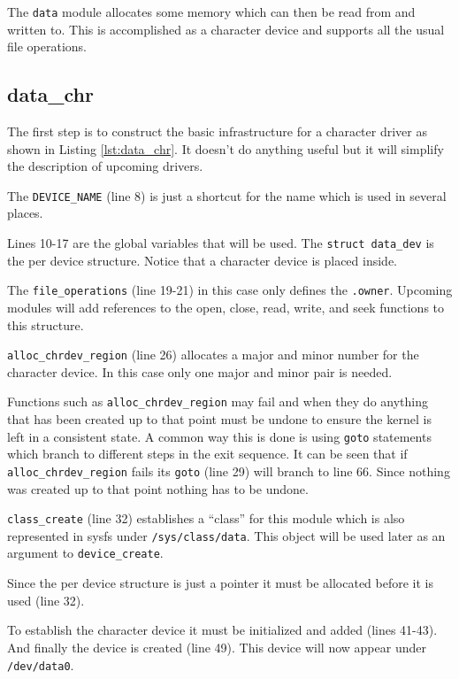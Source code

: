 \documentclass{article}
\begin{document}
The \verb+data+ module allocates some memory which can
then be read from and written to.
This is accomplished as a character device and supports all
the usual file operations.

\subsection{data\_chr}
\label{sec:data_chr}

The first step is to construct the basic infrastructure for
a character driver as shown in Listing \ref{lst:data_chr}.
It doesn't do anything useful but it will simplify the description
of upcoming drivers.

The \verb+DEVICE_NAME+ (line 8) is just a shortcut for the
name which is used in several places.

Lines 10-17 are the global variables that will be used.
The \verb+struct data_dev+ is the per device structure.
Notice that a character device is placed inside.

The \verb+file_operations+ (line 19-21) in this case only
defines the \verb+.owner+.  Upcoming modules will add references
to the open, close, read, write, and seek functions to this structure.

\verb+alloc_chrdev_region+ (line 26) allocates a major and minor number
for the character device\autocite[Pg. 66]{corbet2009linux}.
In this case only one major and minor pair is needed.

Functions such as \verb+alloc_chrdev_region+ may fail and when they
do anything that has been created up to that point must be undone
to ensure the kernel is left in a consistent state.
A common way this is done is using \verb+goto+ statements which
branch to different steps in the exit
sequence\autocite[Pg. 53]{corbet2009linux}.
It can be seen that if \verb+alloc_chrdev_region+ fails its \verb+goto+
(line 29) will branch to line 66.
Since nothing was created up to that point nothing has to be undone.

\verb+class_create+ (line 32) establishes a ``class'' for this
module which is also represented in sysfs under \verb+/sys/class/data+.
This object will be used later as an argument to \verb+device_create+.

Since the per device structure is just a pointer it must be
allocated before it is used (line 32).

To establish the character device it must be initialized and
added (lines 41-43).  And finally the device is created (line 49).
This device will now appear under \verb+/dev/data0+.
\end{document}
